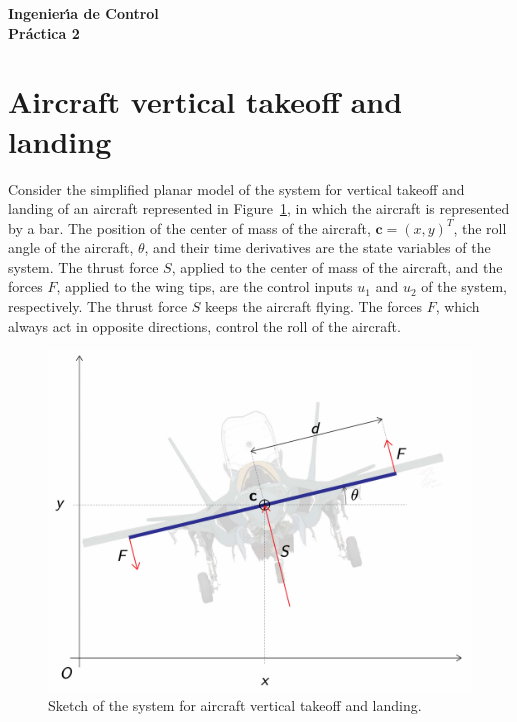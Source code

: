 \documentclass{article}
\begin{document}
\begin{center}
\bf{\huge 
Ingenier\'{\i}a de Control\\
\vspace{0.25cm}
Pr\'actica 2
}
\end{center}

\section*{Aircraft vertical takeoff and landing}

Consider the simplified planar model of the system for vertical takeoff and landing of an aircraft represented in Figure~\ref{fig:figure_2}, in which the aircraft is represented by a bar. 
The position of the center of mass of the aircraft, $\mathbf{c} =  (x, y)^T$, the roll angle of the aircraft, $\theta$, and their time derivatives are the state variables of the system.  
The thrust force $S$, applied to the center of mass of the aircraft, and the forces $F$, applied to the wing tips, are the control inputs $u_1$ and $u_2$ of the system, respectively.
The thrust force $S$ keeps the aircraft flying.
The forces $F$, which always act in opposite directions, control the roll of the aircraft.  





\begin{figure}[H]
\centerline{\includegraphics[width=0.75\columnwidth]{drawing}
}
\caption{Sketch of the system for aircraft vertical takeoff and landing.}
\label{fig:figure_2}
\end{figure}
\end{document}
